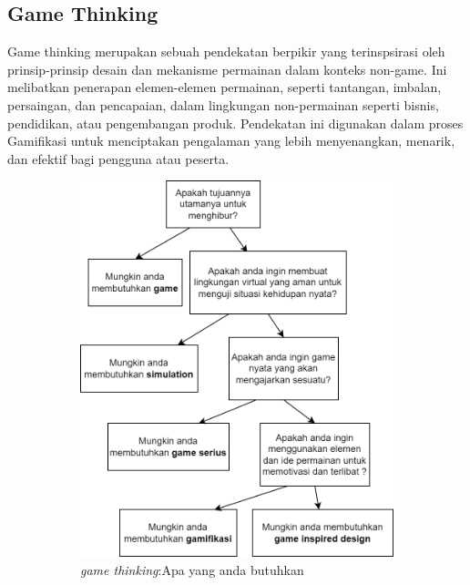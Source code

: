 \subsection{Game Thinking}
Game thinking merupakan sebuah pendekatan berpikir yang terinspsirasi oleh prinsip-prinsip desain dan mekanisme permainan dalam konteks non-game. 
Ini melibatkan penerapan elemen-elemen permainan, seperti tantangan, imbalan, persaingan, dan pencapaian, dalam lingkungan non-permainan seperti bisnis, pendidikan, atau pengembangan produk.
Pendekatan ini digunakan dalam proses Gamifikasi untuk menciptakan pengalaman yang lebih menyenangkan, menarik, dan efektif bagi pengguna atau peserta.
\begin{figure}[H]
	\centering
	\begin{subfigure}[b]{0.42\textwidth}
		\centering
	  \includegraphics[width=\linewidth]{contents/chapter-2/images/Game-thinking-2.png}
	  \caption{\textit{game thinking}:Apa yang anda butuhkan}
	  \label{fig:sub-gamethink-1}
	\end{subfigure}
	\hfill
	\begin{subfigure}[b]{0.42\textwidth}
	\centering

\end{subfigure}
\end{figure}
